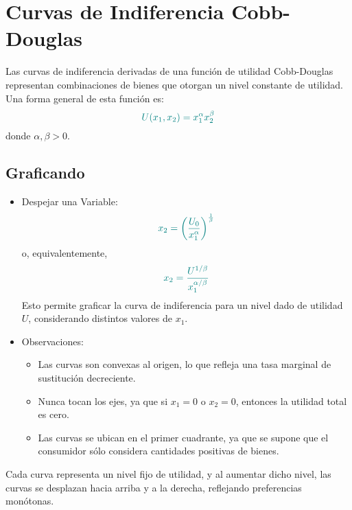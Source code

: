\documentclass{article}
\begin{document}
\section*{Curvas de Indiferencia Cobb-Douglas}

Las {\color{teal}curvas de indiferencia} derivadas de una función de utilidad Cobb-Douglas representan combinaciones de bienes que otorgan un {\color{teal}nivel constante de utilidad}. Una forma general de esta función es:
\begin{equation*}
{\color{teal}U(x_1, x_2) = x_1^\alpha x_2^\beta}
\end{equation*}
donde \( \alpha, \beta > 0 \).

\subsection*{Graficando}
\begin{itemize}
    \item Despejar una Variable:
    \begin{equation*}
    {\color{teal}x_2 = \left( \frac{U_0}{x_1^\alpha} \right)^{\frac{1}{\beta}}}
    \end{equation*}
    o, equivalentemente,
    \begin{equation*}
    {\color{teal}x_2 = \frac{U^{1/\beta}}{x_1^{\alpha/\beta}}}
    \end{equation*}
    Esto permite graficar la curva de indiferencia para un nivel dado de utilidad \( U \), considerando distintos valores de \( x_1 \).

    \item Observaciones:
    \begin{itemize}
        \item Las curvas son {\color{teal}convexas al origen}, lo que refleja una {\color{teal}tasa marginal de sustitución decreciente}.
        \item {\color{teal}Nunca tocan los ejes}, ya que si \( x_1 = 0 \) o \( x_2 = 0 \), entonces la utilidad total es cero.
        \item Las curvas se ubican en el primer cuadrante, ya que se supone que el consumidor sólo considera {\color{teal}cantidades positivas de bienes}.
    \end{itemize}
\end{itemize}

Cada curva representa un {\color{teal}nivel fijo de utilidad}, y al aumentar dicho nivel, las curvas se desplazan hacia arriba y a la derecha, reflejando {\color{teal}preferencias monótonas}.
\end{document}
